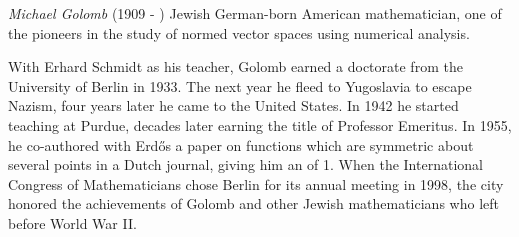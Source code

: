 \documentclass[12pt]{article}
\begin{document}
\emph{Michael Golomb} (1909 - ) Jewish German-born American mathematician, one of the pioneers in the study of normed vector spaces using numerical analysis.

With Erhard Schmidt as his teacher, Golomb earned a doctorate from the University of Berlin in 1933. The next year he fleed to Yugoslavia to escape Nazism, four years later he came to the United States. In 1942 he started teaching at Purdue, decades later earning the title of Professor Emeritus. In 1955, he co-authored with Erd\H{o}s a paper on functions which are symmetric about several points in a Dutch journal, giving him an  of 1. When the International Congress of Mathematicians chose Berlin for its annual meeting in 1998, the city honored the achievements of Golomb and other Jewish mathematicians who left before World War II.
\end{document}
